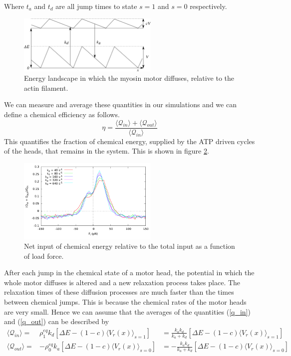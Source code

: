 \documentclass[aps,pre,onecolumn,showpacs,showkeys,a4paper]{revtex4}
\begin{document}
Where $t_a$ and $t_d$ are all jump times to state $s=1$ and $s=0$ respectively. 
\begin{figure}[h]
\centering
\includegraphics[width=0.6\textwidth,height=!]{energy}
\caption{Energy landscape in which the myosin motor diffuses, relative to the actin filament.}
\label{Fig: energy}
\end{figure}
 We can measure and average these quantities in our simulations and we can define a chemical efficiency as follows.
\begin{equation}
\eta = \frac{\langle\mathcal Q_{in}\rangle+\langle\mathcal Q_{out}\rangle}{\langle\mathcal Q_{in}\rangle}
\end{equation}
This quantifies the fraction of chemical energy, supplied by the ATP driven cycles of the heads, that remains in the system. 
This is shown in figure \ref{Fig: chem}.
\begin{figure}[h]
\centering
\includegraphics[width=0.6\textwidth,height=!]{chemical_cycle}
\caption{Net input of chemical energy relative to the total input as a function of load force.}
\label{Fig: chem}
\end{figure}
\par
After each jump in the chemical state of a motor head, the potential in which the whole motor diffuses is altered and a new relaxation process takes place. 
The relaxation times of these diffusion processes are much faster than the times between chemical jumps. 
This is because the chemical rates of the motor heads are very small. 
Hence we can assume that the averages of the quantities (\ref{q_in}) and (\ref{q_out}) can be described by
\begin{eqnarray}
\langle \mathcal Q_{in} \rangle =& \rho^{eq}_1 k_d \left[\Delta E - (1-c)\langle V_r(x) \rangle_{s=1} \right] &= \frac{k_a k_d}{k_a + k_d}\left[\Delta E - (1-c)\langle V_r(x) \rangle_{s=1} \right] \label{Q_in}\\
\langle \mathcal Q_{out} \rangle =& -\rho^{eq}_0 k_a \left[\Delta E - (1-c)\langle V_r(x) \rangle_{s=0} \right] &= -\frac{k_a k_d}{k_a + k_d}\left[\Delta E - (1-c)\langle V_r(x) \rangle_{s=0} \right]\label{Q_out}
\end{eqnarray}
\end{document}
